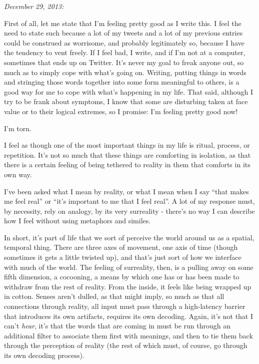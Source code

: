 \emph{December 29, 2013:}

First of all, let me state that I'm feeling pretty good as I write this. I feel the need to state such because a lot of my tweets and a lot of my previous entries could be construed as worrisome, and probably legitimately so, because I have the tendency to vent freely. If I feel bad, I write, and if I'm not at a computer, sometimes that ends up on Twitter. It's never my goal to freak anyone out, so much as to simply cope with what's going on. Writing, putting things in words and stringing those words together into some form meaningful to others, is a good way for me to cope with what's happening in my life. That said, although I try to be frank about symptoms, I know that some are disturbing taken at face value or to their logical extremes, so I promise: I'm feeling pretty good now!

I'm torn.

I feel as though one of the most important things in my life is ritual, process, or repetition. It's not so much that these things are comforting in isolation, as that there is a certain feeling of being tethered to reality in them that comforts in its own way.

I've been asked what I mean by reality, or what I mean when I say ``that makes me feel real'' or ``it's important to me that I feel real''. A lot of my response must, by necessity, rely on analogy, by its very surreality - there's no way I can describe how I feel without using metaphors and similes.

In short, it's part of life that we sort of perceive the world around us as a spatial, temporal thing. There are three axes of movement, one axis of time (though sometimes it gets a little twisted up), and that's just sort of how we interface with much of the world. The feeling of surreality, then, is a pulling away on some fifth dimension, a cocooning, a means by which one has or has been made to withdraw from the rest of reality. From the inside, it feels like being wrapped up in cotton. Senses aren't dulled, as that might imply, so much as that all connections through reality, all input must pass through a high-latency barrier that introduces its own artifacts, requires its own decoding. Again, it's not that I can't \emph{hear}, it's that the words that are coming in must be run through an additional filter to associate them first with meanings, and then to tie them back through the perception of reality (the rest of which must, of course, go through its own decoding process).

